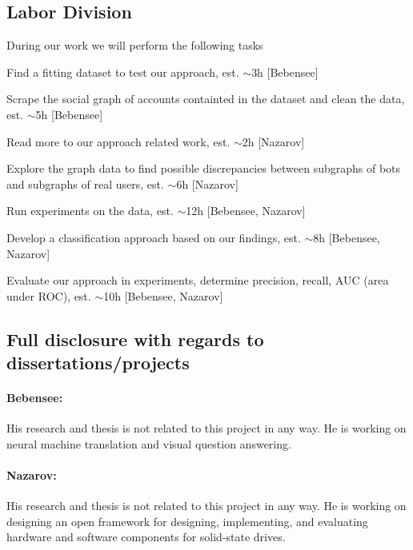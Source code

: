 \subsection{Labor Division}

During our work we will perform the following tasks
\bit
\item Find a fitting dataset to test our approach, est. $\sim$3h [Bebensee]
\item Scrape the social graph of accounts containted in the dataset and clean the data, est. $\sim$5h [Bebensee]
\item Read more to our approach related work, est. $\sim$2h [Nazarov]
\item Explore the graph data to find possible discrepancies between subgraphs of bots and subgraphs of real users, est. $\sim$6h [Nazarov]
\item Run experiments on the data, est. $\sim$12h [Bebensee, Nazarov]
\item Develop a classification approach based on our findings, est. $\sim$8h [Bebensee, Nazarov]
\item Evaluate our approach in experiments, determine precision, recall, AUC (area under ROC), est. $\sim$10h [Bebensee, Nazarov]
\eit

\subsection{Full disclosure with regards to dissertations/projects}

\paragraph{Bebensee:}
His research and thesis is not related to this project in any way. He is working on neural machine translation and visual question answering.

\paragraph{Nazarov:}
His research and thesis is not related to this project in any way. He is working on designing an open framework for designing, implementing, and evaluating hardware and software components for solid-state drives. 